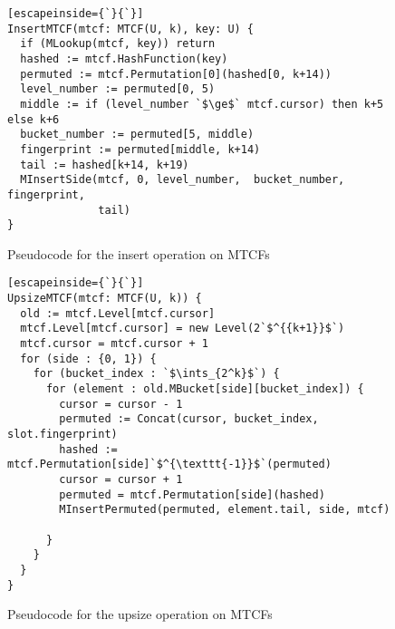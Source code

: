 \documentclass[manuscript,screen,review]{acmart}
\newcommand{\ints}{\mathbb{Z}}
\newcommand{\dotcup}{\ensuremath{\mathaccent\cdot\cup}}
\begin{document}
\begin{figure}

\begin{lstlisting}[escapeinside={`}{`}]
InsertMTCF(mtcf: MTCF(U, k), key: U) {
  if (MLookup(mtcf, key)) return
  hashed := mtcf.HashFunction(key)
  permuted := mtcf.Permutation[0](hashed[0, k+14))
  level_number := permuted[0, 5)
  middle := if (level_number `$\ge$` mtcf.cursor) then k+5 else k+6
  bucket_number := permuted[5, middle)
  fingerprint := permuted[middle, k+14)
  tail := hashed[k+14, k+19)
  MInsertSide(mtcf, 0, level_number,  bucket_number, fingerprint,
              tail)
}
\end{lstlisting}
\caption{Pseudocode for the insert operation on MTCFs}

\end{figure}

\begin{figure}
\begin{lstlisting}[escapeinside={`}{`}]
UpsizeMTCF(mtcf: MTCF(U, k)) {
  old := mtcf.Level[mtcf.cursor]
  mtcf.Level[mtcf.cursor] = new Level(2`$^{{k+1}}$`)
  mtcf.cursor = mtcf.cursor + 1
  for (side : {0, 1}) {
    for (bucket_index : `$\ints_{2^k}$`) {
      for (element : old.MBucket[side][bucket_index]) {
        cursor = cursor - 1
        permuted := Concat(cursor, bucket_index, slot.fingerprint)
        hashed := mtcf.Permutation[side]`$^{\texttt{-1}}$`(permuted)
        cursor = cursor + 1
        permuted = mtcf.Permutation[side](hashed)
        MInsertPermuted(permuted, element.tail, side, mtcf)

      }
    }
  }
}
\end{lstlisting}
\caption{Pseudocode for the upsize operation on MTCFs}
\end{figure}



\end{document}
